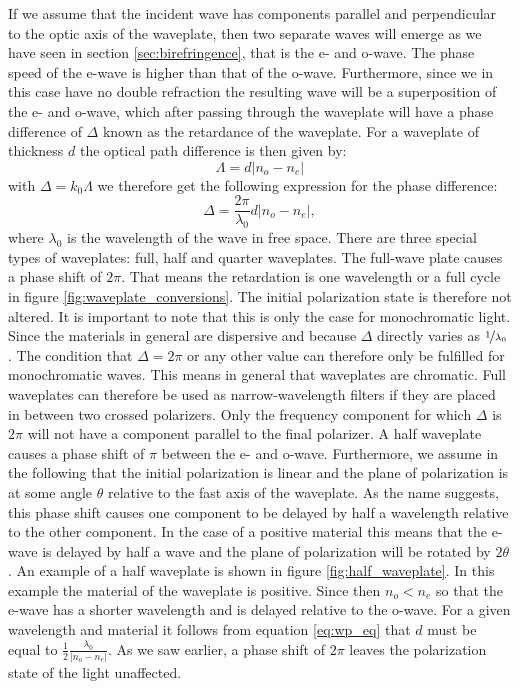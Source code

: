 If we assume that the incident wave has components parallel and perpendicular to the optic axis of the waveplate, then two separate waves will emerge as we have seen in section \ref{sec:birefringence}, that is the e- and o-wave. The phase speed of the e-wave is higher than that of the o-wave. Furthermore, since we in this case have no double refraction the resulting wave will be a superposition of the e- and o-wave, which after passing through the waveplate will have a phase difference of $\Delta$ known as the retardance of the waveplate. For a waveplate of thickness $d$ the optical path difference is then given by:
\begin{equation}
    \Lambda = d|n_o - n_e|
\end{equation}
with $\Delta = k_0 \Lambda$ we therefore get the following expression for the phase difference:
\begin{equation}
    \label{eq:wp_eq}
    \Delta = \frac{2\pi}{\lambda_0}d|n_o - n_e|,
\end{equation}
where $\lambda_0$ is the wavelength of the wave in free space. There are three special types of waveplates: full, half and quarter waveplates. The full-wave plate causes a phase shift of $2\pi$. That means the retardation is one wavelength or a full cycle in figure \ref{fig:waveplate_conversions}. The initial polarization state is therefore not altered. It is important to note that this is only the case for monochromatic light. Since the materials in general are dispersive and because $\Delta$ directly varies as $\nicefrac{1}{\lambda_0}$. The condition that $\Delta = 2\pi$ or any other value can therefore only be fulfilled for monochromatic waves. This means in general that waveplates are chromatic. Full waveplates can therefore be used as narrow-wavelength filters if they are placed in between two crossed polarizers. Only the frequency component for which $\Delta$ is $2\pi$ will not have a component parallel to the final polarizer. A half waveplate causes a phase shift of $\pi$ between the e- and o-wave. Furthermore, we assume in the following that the initial polarization is linear and the plane of polarization is at some angle $\theta$ relative to the fast axis of the waveplate. As the name suggests, this phase shift causes one component to be delayed by half a wavelength relative to the other component. In the case of a positive material this means that the e-wave is delayed by half a wave and the plane of polarization will be rotated by $2\theta$. An example of a half waveplate is shown in figure \ref{fig:half_waveplate}. In this example the material of the waveplate is positive. Since then $n_o<n_e$ so that the e-wave has a shorter wavelength and is delayed relative to the o-wave. For a given wavelength and material it follows from equation \ref{eq:wp_eq} that $d$ must be equal to $\frac{1}{2}\frac{\lambda_0}{|n_o - n_e|}$. As we saw earlier, a phase shift of $2\pi$ leaves the polarization state of the light unaffected. 

